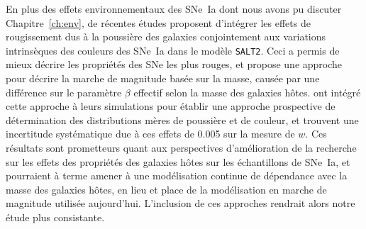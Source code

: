 \documentclass[../main/main.tex]{subfiles}
\begin{document}
En plus des effets environnementaux des SNe~Ia dont nous avons pu discuter
Chapitre~\ref{ch:env}, de récentes études \citep{brout2021} proposent
d'intégrer les effets de rougissement dus à la poussière des galaxies
conjointement aux variations intrinsèques des couleurs des SNe~Ia dans le modèle
\texttt{SALT2}. Ceci a permis de mieux décrire les propriétés des SNe les plus
rouges, et propose une approche pour décrire la marche de magnitude basée sur la
masse, causée par une différence sur le paramètre $\beta$ effectif selon la
masse des galaxies hôtes. \cite{popovic2021b} ont intégré cette approche à leurs
simulations pour établir une approche prospective de détermination des
distributions mères de poussière et de couleur, et trouvent une incertitude
systématique due à ces effets de \num{0.005} sur la mesure de $w$. Ces résultats
sont prometteurs quant aux perspectives d'amélioration de la recherche sur les
effets des propriétés des galaxies hôtes sur les échantillons de SNe~Ia, et
pourraient à terme amener à une modélisation continue de dépendance avec la
masse des galaxies hôtes, en lieu et place de la modélisation en marche de
magnitude utilisée aujourd'hui. L'inclusion de ces approches rendrait alors
notre étude plus consistante.

% 
% 
\end{document}
